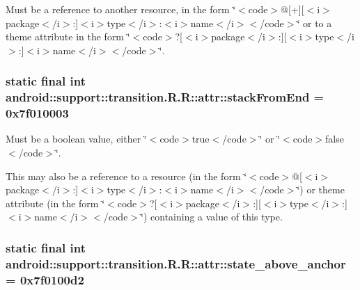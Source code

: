 Must be a reference to another resource, in the form \char`\"{}$<$code$>$@\mbox{[}+\mbox{]}\mbox{[}$<$i$>$package$<$/i$>$:\mbox{]}$<$i$>$type$<$/i$>$:$<$i$>$name$<$/i$>$$<$/code$>$\char`\"{} or to a theme attribute in the form \char`\"{}$<$code$>$?\mbox{[}$<$i$>$package$<$/i$>$:\mbox{]}\mbox{[}$<$i$>$type$<$/i$>$:\mbox{]}$<$i$>$name$<$/i$>$$<$/code$>$\char`\"{}. \hypertarget{classandroid_1_1support_1_1transition_1_1_r_1_1attr_fdfdb200da6eedfc3080568638598e8a}{
\subsubsection[{stackFromEnd}]{\setlength{\rightskip}{0pt plus 5cm}static final int android::support::transition.R.R::attr::stackFromEnd = 0x7f010003}}
\label{classandroid_1_1support_1_1transition_1_1_r_1_1attr_fdfdb200da6eedfc3080568638598e8a}


Must be a boolean value, either \char`\"{}$<$code$>$true$<$/code$>$\char`\"{} or \char`\"{}$<$code$>$false$<$/code$>$\char`\"{}. 

This may also be a reference to a resource (in the form \char`\"{}$<$code$>$@\mbox{[}$<$i$>$package$<$/i$>$:\mbox{]}$<$i$>$type$<$/i$>$:$<$i$>$name$<$/i$>$$<$/code$>$\char`\"{}) or theme attribute (in the form \char`\"{}$<$code$>$?\mbox{[}$<$i$>$package$<$/i$>$:\mbox{]}\mbox{[}$<$i$>$type$<$/i$>$:\mbox{]}$<$i$>$name$<$/i$>$$<$/code$>$\char`\"{}) containing a value of this type. \hypertarget{classandroid_1_1support_1_1transition_1_1_r_1_1attr_848e8b86a951e938e6367fdc801a44e8}{
\subsubsection[{state\_\-above\_\-anchor}]{\setlength{\rightskip}{0pt plus 5cm}static final int android::support::transition.R.R::attr::state\_\-above\_\-anchor = 0x7f0100d2}}
\label{classandroid_1_1support_1_1transition_1_1_r_1_1attr_848e8b86a951e938e6367fdc801a44e8}


